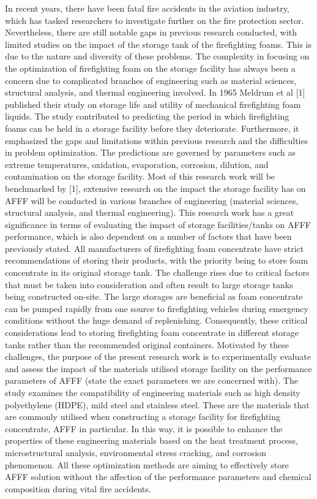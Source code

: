 \documentclass[12pt]{report}
\begin{document}
In recent years, there have been fatal fire accidents in the aviation industry, which has tasked researchers to investigate further on the fire protection sector. Nevertheless, there are still notable gaps in previous research conducted, with limited studies on the impact of the storage tank of the firefighting foams. This is due to the nature and diversity of these problems. The complexity in focusing on the optimization of firefighting foam on the storage facility has always been a concern due to complicated branches of engineering such as material sciences, structural analysis, and thermal engineering involved. 
In 1965 Meldrum et al [1] published their study on storage life and utility of mechanical firefighting foam liquids. The study contributed to predicting the period in which firefighting foams can be held in a storage facility before they deteriorate. Furthermore, it emphasized the gaps and limitations within previous research and the difficulties in problem optimization. The predictions are governed by parameters such as extreme temperatures, oxidation, evaporation, corrosion, dilution, and contamination on the storage facility. Most of this research work will be benchmarked by [1], extensive research on the impact the storage facility has on AFFF will be conducted in various branches of engineering (material sciences, structural analysis, and thermal engineering).
This research work has a great significance in terms of evaluating the impact of storage facilities/tanks on AFFF performance, which is also dependent on a number of factors that have been previously stated. All manufacturers of firefighting foam concentrate have strict recommendations of storing their products, with the priority being to store foam concentrate in its original storage tank. The challenge rises due to critical factors that must be taken into consideration and often result to large storage tanks being constructed on-site. The large storages are beneficial as foam concentrate can be pumped rapidly from one source to firefighting vehicles during emergency conditions without the huge demand of replenishing. Consequently, these critical considerations lead to storing firefighting foam concentrate in different storage tanks rather than the recommended original containers.
 Motivated by these challenges, the purpose of the present research work is to experimentally evaluate and assess the impact of the materials utilised storage facility on the performance parameters of AFFF (state the exact parameters we are concerned with). The study examines the compatibility of engineering materials such as high density polyethylene (HDPE), mild steel and stainless steel. These are the materials that are commonly utilised when constructing a storage facility for firefighting concentrate, AFFF in particular. In this way, it is possible to enhance the properties of these engineering materials based on the heat treatment process, microstructural analysis, environmental stress cracking, and corrosion phenomenon. All these optimization methods are aiming to effectively store AFFF solution without the affection of the performance parameters and chemical composition during vital fire accidents. 
\end{document}
